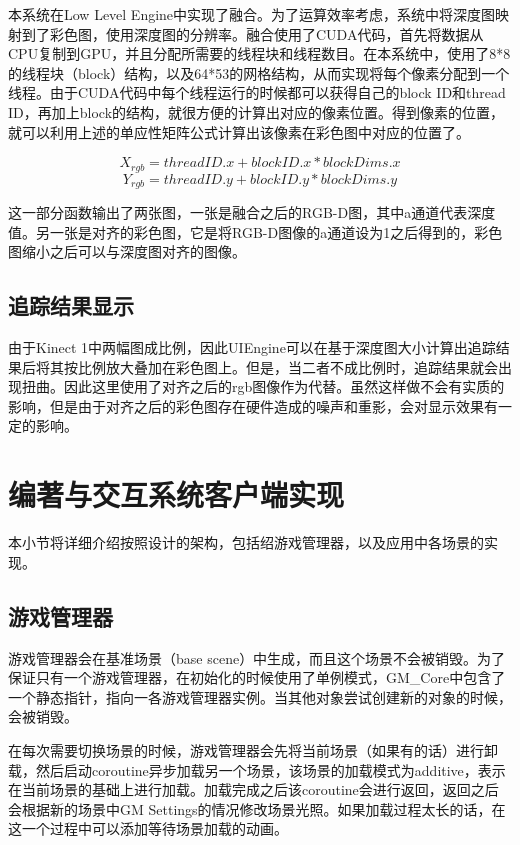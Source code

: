 本系统在Low Level Engine中实现了融合。为了运算效率考虑，系统中将深度图映射到了彩色图，使用深度图的分辨率。融合使用了CUDA代码，首先将数据从CPU复制到GPU，并且分配所需要的线程块和线程数目。在本系统中，使用了8*8的线程块（block）结构，以及64*53的网格结构，从而实现将每个像素分配到一个线程。由于CUDA代码中每个线程运行的时候都可以获得自己的block ID和thread ID，再加上block的结构，就很方便的计算出对应的像素位置。得到像素的位置，就可以利用上述的单应性矩阵公式计算出该像素在彩色图中对应的位置了。
	
\begin{equation}
 X_{rgb} = threadID.x + blockID.x * blockDims.x
\end{equation}
\begin{equation}
 Y_{rgb} = threadID.y + blockID.y * blockDims.y
\end{equation}

这一部分函数输出了两张图，一张是融合之后的RGB-D图，其中a通道代表深度值。另一张是对齐的彩色图，它是将RGB-D图像的a通道设为1之后得到的，彩色图缩小之后可以与深度图对齐的图像。

\subsection{追踪结果显示}

由于Kinect 1中两幅图成比例，因此UIEngine可以在基于深度图大小计算出追踪结果后将其按比例放大叠加在彩色图上。但是，当二者不成比例时，追踪结果就会出现扭曲。因此这里使用了对齐之后的rgb图像作为代替。虽然这样做不会有实质的影响，但是由于对齐之后的彩色图存在硬件造成的噪声和重影，会对显示效果有一定的影响。

\section{编著与交互系统客户端实现}
本小节将详细介绍按照设计的架构，包括绍游戏管理器，以及应用中各场景的实现。

\subsection{游戏管理器}
游戏管理器会在基准场景（base scene）中生成，而且这个场景不会被销毁。为了保证只有一个游戏管理器，在初始化的时候使用了单例模式，GM\_Core中包含了一个静态指针，指向一各游戏管理器实例。当其他对象尝试创建新的对象的时候，会被销毁。

在每次需要切换场景的时候，游戏管理器会先将当前场景（如果有的话）进行卸载，然后启动coroutine异步加载另一个场景，该场景的加载模式为additive，表示在当前场景的基础上进行加载。加载完成之后该coroutine会进行返回，返回之后会根据新的场景中GM Settings的情况修改场景光照。如果加载过程太长的话，在这一个过程中可以添加等待场景加载的动画。

